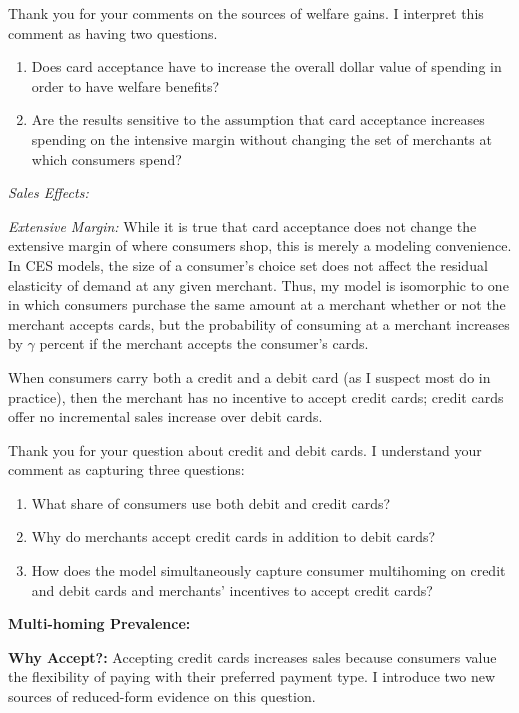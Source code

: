 \documentclass[main.tex]{subfiles}
\begin{document}
\begin{refsection}
Thank you for your comments on the sources of welfare gains.
I interpret this comment as having two questions.

\begin{enumerate}
    \item Does card acceptance have to increase the overall dollar value of spending in order to have welfare benefits?
    \item Are the results sensitive to the assumption that card acceptance increases spending on the intensive margin without changing the set of merchants at which consumers spend?
\end{enumerate}

\emph{Sales Effects: } \replyoverallspend

\emph{Extensive Margin: } While it is true that card acceptance does not change the extensive margin of where consumers shop, this is merely a modeling convenience.
In CES models, the size of a consumer's choice set does not affect the residual elasticity of demand at any given merchant.
Thus, my model is isomorphic to one in which consumers purchase the same amount at a merchant whether or not the merchant accepts cards, but the probability of consuming at a merchant increases by $\gamma$ percent if the merchant accepts the consumer's cards.

\begin{refcomment}
When consumers carry both a credit and a debit card (as I suspect most do in practice), then the merchant has no incentive to accept credit cards; credit cards offer no incremental sales increase over debit cards.
\end{refcomment}

Thank you for your question about credit and debit cards.
I understand your comment as capturing three questions:
\begin{enumerate}
    \item What share of consumers use both debit and credit cards?
    \item Why do merchants accept credit cards in addition to debit cards?
    \item How does the model simultaneously capture consumer multihoming on credit and debit cards and merchants' incentives to accept credit cards?
\end{enumerate}

\textbf{Multi-homing Prevalence: } \replycreditdebitmulti

\textbf{Why Accept?: } Accepting credit cards increases sales because consumers value the flexibility of paying with their preferred payment type.
I introduce two new sources of reduced-form evidence on this question.
\replywhyacceptcredit


\end{refsection}
\end{document}
